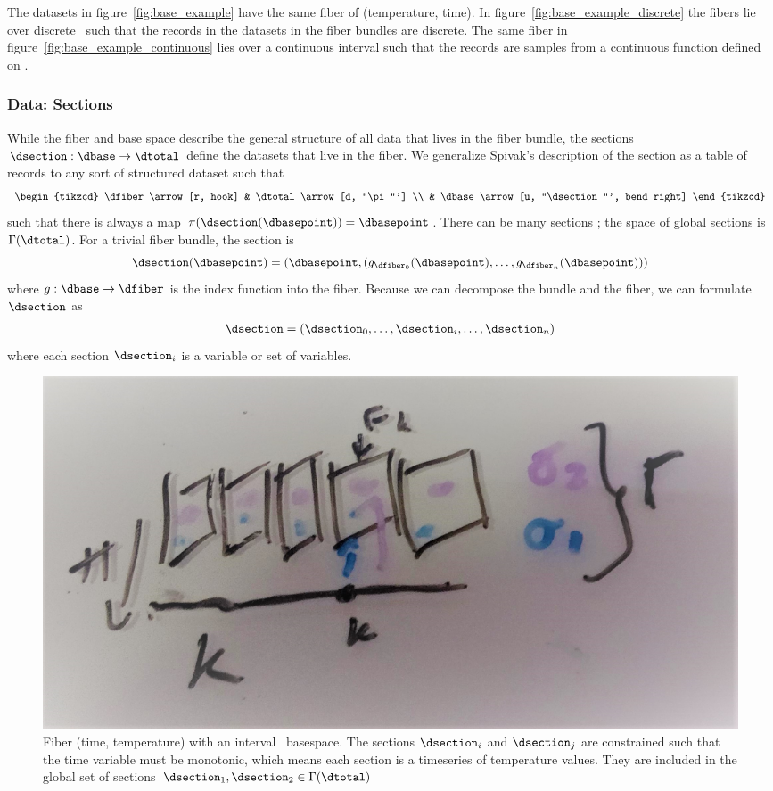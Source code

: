 \documentclass[../main.tex]{subfiles}
\begin{document}
The datasets in figure~\ref{fig:base_example} have the same fiber of (temperature, time). In figure~\ref{fig:base_example_discrete} the fibers lie over discrete \dbase\ such that the records in the datasets in the fiber bundles are discrete. The same fiber in figure~\ref{fig:base_example_continuous} lies over a continuous interval \dbase such that the records are samples from a continuous function defined on \dbase.

\subsubsection{Data: Sections \dsection}
\label{sec:data_section}
While the fiber and base space describe the general structure of all data that lives in the fiber bundle, the sections $\dsection: \dbase\rightarrow \dtotal$ define the datasets that live in the fiber. We generalize Spivak's description of the section as a table of records \cite{spivakSIMPLICIALDATABASES} to any sort of structured dataset such that 
\begin{equation}
    \begin{tikzcd}
        \dfiber \arrow[r, hook] & \dtotal \arrow[d, "\pi"'] \\
                          & \dbase \arrow[u, "\dsection"', bend right]
    \end{tikzcd}
\end{equation}
such that there is always a map $\pi(\dsection(\dbasepoint)) = \dbasepoint$. There can be many sections \dsection; the space of global sections is $\Gamma(\dtotal)$. For a trivial fiber bundle, the section is 
\begin{equation}
    \label{eq:section_return}
    \dsection(\dbasepoint) = (\dbasepoint, (g_{\dfiber_{0}}(\dbasepoint), \ldots, g_{\dfiber_{n}}(\dbasepoint)))
\end{equation}
where $g: \dbase \rightarrow \dfiber$ is the index function into the fiber. Because we can decompose the bundle and the fiber, we can formulate $\dsection$ as 
\begin{align}
\dsection= (\dsection_0,\ldots, \dsection_i, \dots, \dsection_n) 
\end{align}
where each section $\dsection_i$ is a variable or set of variables. 

\begin{figure}[H]
    \includegraphics[width=.5\linewidth]{figures/math/fiberbundle.png}
    \caption{ Fiber (time, temperature) with an interval \dbase\ basespace. The sections $\dsection_i$ and $\dsection_j$ are constrained such that the time variable must be monotonic, which means each section is a timeseries of temperature values. They are included in the global set of sections  $\dsection_1, \dsection_2 \in \Gamma(\dtotal)$}
    \label{fig:data_sections}
\end{figure}
\end{document}

